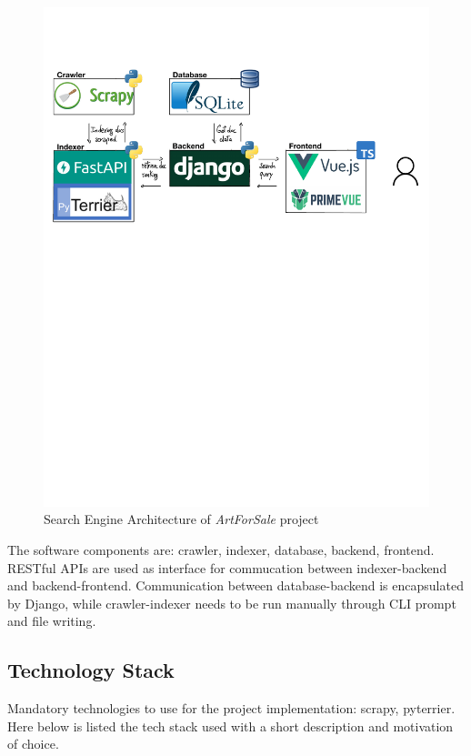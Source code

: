 \documentclass[12pt]{spieman}  %
\begin{document}
\begin{spacing}{1}
    \begin{figure}[H]
        \centering
        \caption{Search Engine Architecture of \textit{ArtForSale} project}
        \label{fig:architecture}
        \includegraphics[width=\textwidth, trim={0cm 16cm 0cm 3cm}]{figures/architecture.pdf}
    \end{figure}

    The software components are: crawler, indexer, database, backend, frontend.\\
    RESTful APIs are used as interface for commucation between indexer-backend and backend-frontend.
    Communication between database-backend is encapsulated by Django,
    while crawler-indexer needs to be run manually through CLI prompt and file writing.

    \subsection{Technology Stack}
    Mandatory technologies to use for the project implementation: scrapy, pyterrier.
    Here below is listed the tech stack used with a short description and motivation of choice.


\end{spacing}
\end{document}
